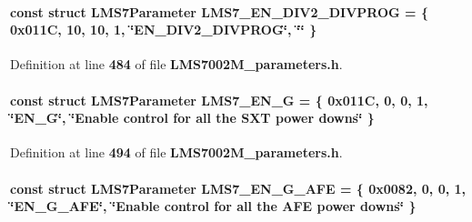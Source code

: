 \paragraph[{L\+M\+S7\+\_\+\+E\+N\+\_\+\+D\+I\+V2\+\_\+\+D\+I\+V\+P\+R\+OG}]{\setlength{\rightskip}{0pt plus 5cm}const struct {\bf L\+M\+S7\+Parameter} L\+M\+S7\+\_\+\+E\+N\+\_\+\+D\+I\+V2\+\_\+\+D\+I\+V\+P\+R\+OG = \{ 0x011\+C, 10, 10, 1, \char`\"{}\+E\+N\+\_\+\+D\+I\+V2\+\_\+\+D\+I\+V\+P\+R\+O\+G\char`\"{}, \char`\"{}\char`\"{} \}\hspace{0.3cm}{\ttfamily [static]}}\label{LMS7002M__parameters_8h_a56643937b1dfed2bcced10cbc873e958}


Definition at line {\bf 484} of file {\bf L\+M\+S7002\+M\+\_\+parameters.\+h}.

\paragraph[{L\+M\+S7\+\_\+\+E\+N\+\_\+G}]{\setlength{\rightskip}{0pt plus 5cm}const struct {\bf L\+M\+S7\+Parameter} L\+M\+S7\+\_\+\+E\+N\+\_\+G = \{ 0x011\+C, 0, 0, 1, \char`\"{}\+E\+N\+\_\+\+G\char`\"{}, \char`\"{}\+Enable control for all the S\+X\+T power downs\char`\"{} \}\hspace{0.3cm}{\ttfamily [static]}}\label{LMS7002M__parameters_8h_a893d53ca6df1cc94de94e1a7608ac09e}


Definition at line {\bf 494} of file {\bf L\+M\+S7002\+M\+\_\+parameters.\+h}.

\paragraph[{L\+M\+S7\+\_\+\+E\+N\+\_\+\+G\+\_\+\+A\+FE}]{\setlength{\rightskip}{0pt plus 5cm}const struct {\bf L\+M\+S7\+Parameter} L\+M\+S7\+\_\+\+E\+N\+\_\+\+G\+\_\+\+A\+FE = \{ 0x0082, 0, 0, 1, \char`\"{}\+E\+N\+\_\+\+G\+\_\+\+A\+F\+E\char`\"{}, \char`\"{}\+Enable control for all the A\+F\+E power downs\char`\"{} \}\hspace{0.3cm}{\ttfamily [static]}}\label{LMS7002M__parameters_8h_ae19e3e9ca85c9d620d11450dcffe3f78}


